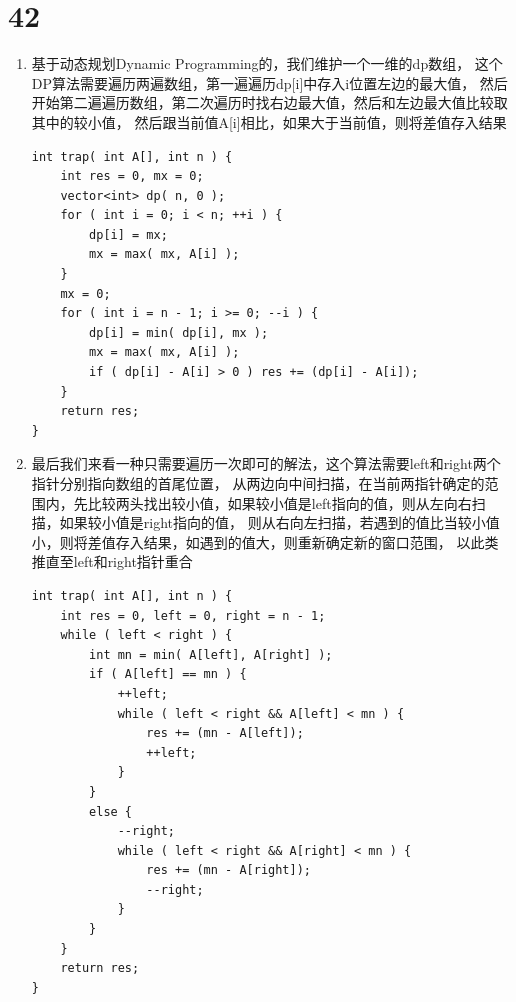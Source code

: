 \documentclass[12pt,a4paper]{article}
\begin{document}
\section{42}
\begin{enumerate}
\item
\begin{CJK}{UTF8}{gbsn}
基于动态规划Dynamic Programming的，我们维护一个一维的dp数组，
这个DP算法需要遍历两遍数组，第一遍遍历dp[i]中存入i位置左边的最大值，
然后开始第二遍遍历数组，第二次遍历时找右边最大值，然后和左边最大值比较取其中的较小值，
然后跟当前值A[i]相比，如果大于当前值，则将差值存入结果
\end{CJK}
\begin{lstlisting}
int trap( int A[], int n ) {
	int res = 0, mx = 0;
	vector<int> dp( n, 0 );
	for ( int i = 0; i < n; ++i ) {
		dp[i] = mx;
		mx = max( mx, A[i] );
	}
	mx = 0;
	for ( int i = n - 1; i >= 0; --i ) {
		dp[i] = min( dp[i], mx );
		mx = max( mx, A[i] );
		if ( dp[i] - A[i] > 0 ) res += (dp[i] - A[i]);
	}
	return res;
}
\end{lstlisting}
\item
\begin{CJK}{UTF8}{gbsn}
最后我们来看一种只需要遍历一次即可的解法，这个算法需要left和right两个指针分别指向数组的首尾位置，
从两边向中间扫描，在当前两指针确定的范围内，先比较两头找出较小值，如果较小值是left指向的值，则从左向右扫描，如果较小值是right指向的值，
则从右向左扫描，若遇到的值比当较小值小，则将差值存入结果，如遇到的值大，则重新确定新的窗口范围，
以此类推直至left和right指针重合
\end{CJK}
\begin{lstlisting}
int trap( int A[], int n ) {
	int res = 0, left = 0, right = n - 1;
	while ( left < right ) {
		int mn = min( A[left], A[right] );
		if ( A[left] == mn ) {
			++left;
			while ( left < right && A[left] < mn ) {
				res += (mn - A[left]);
				++left;
			}
		}
		else {
			--right;
			while ( left < right && A[right] < mn ) {
				res += (mn - A[right]);
				--right;
			}
		}
	}
	return res;
}
\end{lstlisting}
\end{enumerate}
\end{document}
